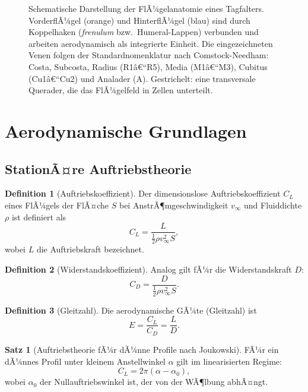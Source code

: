 ﻿\documentclass[a4paper,12pt]{article}
\theoremstyle{definition}
\newtheorem{definition}{Definition}
\newtheorem{satz}{Satz}
\begin{document}
\begin{figure}[H]
		\caption{Schematische Darstellung der FlÃ¼gelanatomie eines Tagfalters.
			VorderflÃ¼gel (orange) und HinterflÃ¼gel (blau) sind durch Koppelhaken
			(\textit{frenulum} bzw.\ Humeral-Lappen) verbunden und arbeiten aerodynamisch
			als integrierte Einheit. Die eingezeichneten Venen folgen der Standardnomenklatur
			nach Comstock-Needham: Costa, Subcosta, Radius (R1â€“R5), Media (M1â€“M3),
			Cubitus (Cu1â€“Cu2) und Analader (A). Gestrichelt: eine transversale Querader,
			die das FlÃ¼gelfeld in Zellen unterteilt.}
		\label{fig:anatomie_tikz}
	\end{figure}
	
	\section{Aerodynamische Grundlagen}
	\label{sec:aerodynamik}
	
	\subsection{StationÃ¤re Auftriebstheorie}
	
	\begin{definition}[Auftriebskoeffizient]
		Der dimensionslose Auftriebskoeffizient $C_L$ eines FlÃ¼gels der FlÃ¤che $S$ bei
		AnstrÃ¶mgeschwindigkeit $v_\infty$ und Fluiddichte $\rho$ ist definiert als
		\[
		C_L = \frac{L}{\frac{1}{2}\rho v_\infty^2 S},
		\]
		wobei $L$ die Auftriebskraft bezeichnet.
	\end{definition}
	
	\begin{definition}[Widerstandskoeffizient]
		Analog gilt fÃ¼r die Widerstandskraft $D$:
		\[
		C_D = \frac{D}{\frac{1}{2}\rho v_\infty^2 S}.
		\]
	\end{definition}
	
	\begin{definition}[Gleitzahl]
		Die aerodynamische GÃ¼te (Gleitzahl) ist
		\[
		E = \frac{C_L}{C_D} = \frac{L}{D}.
		\]
	\end{definition}
	
	\begin{satz}[Auftriebstheorie fÃ¼r dÃ¼nne Profile nach Joukowski]
		\label{satz:joukowski}
		FÃ¼r ein dÃ¼nnes Profil unter kleinem Anstellwinkel $\alpha$ gilt im linearisierten Regime:
		\[
		C_L = 2\pi (\alpha - \alpha_0),
		\]
		wobei $\alpha_0$ der Nullauftriebswinkel ist, der von der WÃ¶lbung abhÃ¤ngt.
	\end{satz}
	
\end{document}
